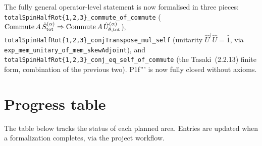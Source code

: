 \documentclass[a4paper,11pt]{article}
\begin{document}
The fully general operator-level statement is now formalised in
three pieces:
\texttt{totalSpinHalfRot\{1,2,3\}\_commute\_of\_commute}
($\mathrm{Commute}\,A\,\hat S^{(\alpha)}_{\rm tot}
  \Rightarrow \mathrm{Commute}\,A\,\hat U^{(\alpha)}_{\theta,{\rm tot}}$),
\texttt{totalSpinHalfRot\{1,2,3\}\_conjTranspose\_mul\_self}
(unitarity $\hat U^\dagger\hat U = \hat 1$, via
\texttt{exp\_mem\_unitary\_of\_mem\_skewAdjoint}), and
\texttt{totalSpinHalfRot\{1,2,3\}\_conj\_eq\_self\_of\_commute}
(the Tasaki~(2.2.13) finite form, combination of the previous two).
P1f''' is now fully closed without axioms.

\section{Progress table}
\label{sec:progress}

The table below tracks the status of each planned area. Entries are
updated when a formalization completes, via the project workflow.
\end{document}
